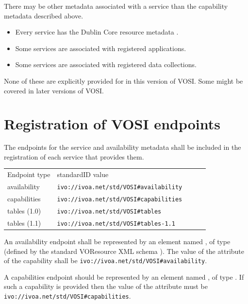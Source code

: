 \documentclass[11pt,letter]{ivoa}
\begin{document}
There may be other metadata associated with a service than the capability metadata described above.

\begin{itemize}
\item Every service has the Dublin Core resource metadata \citep{std:DUBLINCORE}.
\item Some services are associated with registered applications.
\item Some services are associated with registered data collections. 
\end{itemize}

None of these are explicitly provided for in this version of VOSI. Some might be covered in later versions of VOSI. 

\section{Registration of VOSI endpoints}
\label{sec:endpoints}

The endpoints for the service and availability metadata shall be included in the registration of each service that provides them.

\begin{tabular}{l l l l l}
\label{tab:registration}
Endpoint type & standardID value \\
availability & \nolinkurl{ivo://ivoa.net/std/VOSI#availability} \\
capabilities & \nolinkurl{ivo://ivoa.net/std/VOSI#capabilities} \\
tables (1.0) & \nolinkurl{ivo://ivoa.net/std/VOSI#tables} \\
tables (1.1) & \nolinkurl{ivo://ivoa.net/std/VOSI#tables-1.1} \\
\end{tabular}

An availability endpoint shall be represented by an element named , of type  (defined by the standard VOResource XML schema \citet{std:VOR}). The value of the  attribute of the capability shall be \nolinkurl{ivo://ivoa.net/std/VOSI#availability}.

A capabilities endpoint should be represented by an element named , of type . If such a capability is provided then the value of the  attribute must be \nolinkurl{ivo://ivoa.net/std/VOSI#capabilities}.
\end{document}
